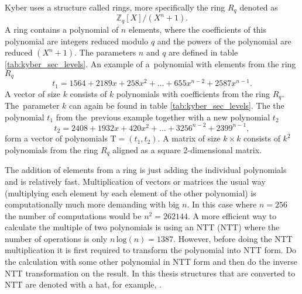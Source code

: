 Kyber uses a structure called rings, more specifically the ring $R_q$ denoted as
\begin{equation}
  \mathbb{Z}_q[X]/(X^n+1).
\end{equation}
A ring contains a polynomial of $n$ elements, where the coefficients of this polynomial are integers reduced modulo $q$ and the powers of the polynomial are reduced $(X^n+1)$. The parameters $n$ and $q$ are defined in table \ref{tab:kyber_sec_levels}. An example of a~polynomial with elements from the ring $R_q$
\begin{equation}
  t_1 = 1564 + 2189x + 258x^2 + \dots + 655x^{n-2} + 2587x^{n-1}.
\end{equation}
A vector of size $k$ consists of $k$ polynomials with coefficients from the ring $R_q$. The~parameter $k$ can again be found in table \ref{tab:kyber_sec_levels}. The the polynomial $t_1$ from the~previous example together with a new polynomial $t_2$
\begin{equation}
  t_2 = 2408 + 1932x + 420x^2 + \dots + 3256^{n-2} + 2399^{n-1},
\end{equation}
form a vector of polynomials $\mathrm{T}=(t_1, t_2)$. A matrix of size $k\times k$ consists of $k^2$ polynomials from the ring $R_q$ aligned as a square 2-dimensional matrix. \cite{YbbuGxVPF0GGTxfN}

The addition of elements from a ring is just adding the individual polynomials and is relatively fast. Multiplication of vectors or matrices the usual way (multiplying each element by each element of the other polynomial) is computationally much more demanding with big $n$. In this case where $n=256$ the number of computations would be $n^2=262144$. A more efficient way to calculate the multiple of two polynomials is using an NTT (\acl{NTT}) where the number of operations is only $n\,\mathrm{log}(n)=1387$. However, before doing the NTT multiplication it is first required to transform the polynomial into NTT form. Do the calculation with some other polynomial in NTT form and then do the inverse NTT transformation on the result. In this thesis structures that are converted to NTT are denoted with a hat, for example, . \cite{Liang2021}
